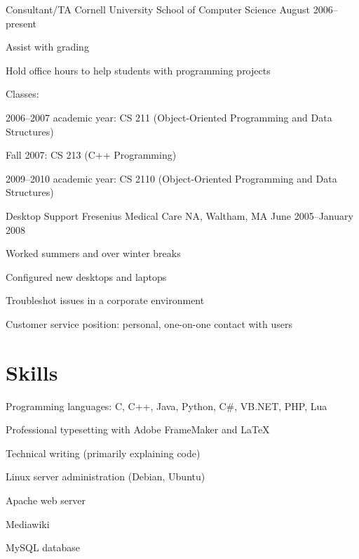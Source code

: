 \documentclass{res}
\begin{document}
\begin{resume}
\affiliation
	{Consultant/TA}
	{Cornell University School of Computer Science}
	{August 2006--present}
	\begin{pos}
	\item Assist with grading
	\item Hold office hours to help students with programming
	projects
	\item Classes:
		\begin{compactitem}
		\item 2006--2007 academic year: CS 211 (Object-Oriented Programming and Data
		Structures)
		\item Fall 2007: CS 213 (C++ Programming)
		\item 2009--2010 academic year: CS 2110 (Object-Oriented Programming and
		Data Structures)
		\end{compactitem}
	\end{pos}

\affiliation
	{Desktop Support}
	{Fresenius Medical Care NA, Waltham, MA}
	{June 2005--January 2008}
	\begin{pos}
	\item Worked summers and over winter breaks
	\item Configured new desktops and laptops
	\item Troubleshot issues in a corporate environment
	\item Customer service position: personal, one-on-one contact with users
	\end{pos}

\section{Skills}
	\vspace{10pt}
	\begin{compactitem}
	\item Programming languages: C, C++, Java, Python, C\#, VB.NET, PHP, Lua
	\item Professional typesetting with Adobe FrameMaker and \LaTeX{}
	\item Technical writing (primarily explaining code)
	\item Linux server administration (Debian, Ubuntu)
		\begin{compactitem}
		\item Apache web server
		\item Mediawiki
		\item MySQL database
		\end{compactitem}
	\end{compactitem}

\end{resume}
\end{document}
